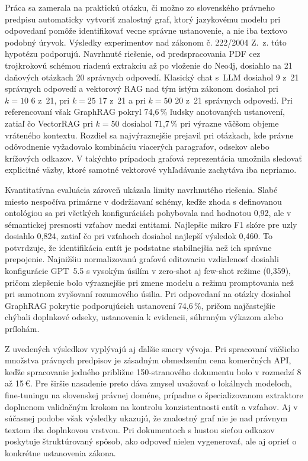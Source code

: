 Práca sa zamerala na praktickú otázku, či možno zo slovenského právneho predpisu automaticky vytvoriť znalostný graf, ktorý jazykovému modelu pri odpovedaní pomôže identifikovať vecne správne ustanovenie, a nie iba textovo podobný úryvok. Výsledky experimentov nad zákonom č. 222/2004 Z.~z. túto hypotézu podporujú. Navrhnuté riešenie, od predspracovania PDF cez trojkrokovú schémou riadenú extrakciu až po vloženie do Neo4j, dosiahlo na 21 daňových otázkach 20 správnych odpovedí. Klasický chat s~LLM dosiahol 9 z~21 správnych odpovedí a vektorový RAG nad tým istým zákonom dosiahol pri $k=10$ 6 z~21, pri $k=25$ 17 z~21 a pri $k=50$ 20 z~21 správnych odpovedí. Pri referencovaní však GraphRAG pokryl 74{,}6\,\% ľudsky anotovaných ustanovení, zatiaľ čo VectorRAG pri $k=50$ dosiahol 71{,}7\,\% pri výrazne väčšom objeme vráteného kontextu. Rozdiel sa najvýraznejšie prejavil pri otázkach, kde právne odôvodnenie vyžadovalo kombináciu viacerých paragrafov, odsekov alebo krížových odkazov. V takýchto prípadoch grafová reprezentácia umožnila sledovať explicitné väzby, ktoré samotné vektorové vyhľadávanie zachytáva iba nepriamo.

Kvantitatívna evaluácia zároveň ukázala limity navrhnutého riešenia. Slabé miesto nespočíva primárne v dodržiavaní schémy, keďže zhoda s definovanou ontológiou sa pri všetkých konfiguráciách pohybovala nad hodnotou 0{,}92, ale v sémantickej presnosti vzťahov medzi entitami. Najlepšie mikro F1 skóre pre uzly dosiahlo 0{,}824, zatiaľ čo pri vzťahoch dosiahol najlepší výsledok 0{,}460. To potvrdzuje, že identifikácia entít je podstatne stabilnejšia než ich správne prepojenie. Najnižšiu normalizovanú grafovú editovaciu vzdialenosť dosiahli konfigurácie GPT~5.5 s vysokým úsilím v zero-shot aj few-shot režime (0{,}359), pričom zlepšenie bolo výraznejšie pri zmene modelu a režimu promptovania než pri samotnom zvyšovaní rozumového úsilia. Pri odpovedaní na otázky dosiahol GraphRAG pokrytie podporujúcich ustanovení 74{,}6\,\%, pričom najčastejšie chýbali doplnkové odseky, ustanovenia k evidencii, súhrnným výkazom alebo prílohám.

Z uvedených výsledkov vyplývajú aj ďalšie smery vývoja. Pri spracovaní väčšieho množstva právnych predpisov je zásadným obmedzením cena komerčných API, keďže spracovanie jedného približne 150-stranového dokumentu bolo v rozmedzí 8 až 15\,€. Pre širšie nasadenie preto dáva zmysel uvažovať o lokálnych modeloch, fine-tuningu na slovenskej právnej doméne, prípadne o špecializovanom extraktore doplnenom validačným krokom na kontrolu konzistentnosti entít a vzťahov. Aj v súčasnej podobe však výsledky ukazujú, že znalostný graf nie je nad právnym textom iba doplnkovou vrstvou. Pri dokumentoch s hustou sieťou odkazov poskytuje štruktúrovaný spôsob, ako odpoveď nielen vygenerovať, ale aj oprieť o konkrétne ustanovenia zákona.
